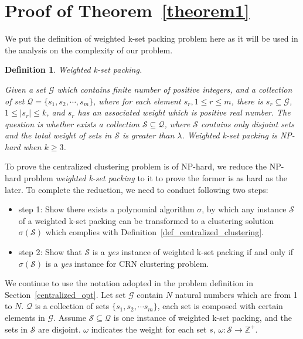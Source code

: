 \documentclass[10pt,journal,compsoc]{IEEEtran}
\makeatletter
\theoremstyle{mytheoremstyle}
\theoremstyle{mytheoremstyle}
\theoremstyle{mytheoremstyle}
\newtheorem{mydef}{Definition}%
\renewenvironment{proof}[1][\proofname]{%
      \par\pushQED{\qed}\fontfamily{ptm}\selectfont%
      \topsep6\p@\@plus6\p@\relax
      \trivlist\item[\hskip\labelsep\bfseries#1\@addpunct{.}]%
      \ignorespaces
    }{%
      \popQED\endtrivlist\@endpefalse
    }
\makeatother
\begin{document}
\section*{Proof of Theorem~\ref{theorem1}}
\label{proof_theorem1}
\begin{proof}
We put the definition of weighted k-set packing problem here as it will be used in the analysis on the complexity of our problem.

\begin{mydef}
\label{def_kset_packing}
\textit{Weighted k-set packing.} 

Given a set $\mathcal{G}$ which contains finite number of positive integers, and a collection of set $\mathcal{Q}=\{s_1,s_2,\cdots,s_m\}$, where for each element $s_r, 1\leq r \leq m$, there is $s_r\subseteq \mathcal{G}$, $ 1\leq|s_r| \leq k$, and $s_r$ has an associated weight which is positive real number.
The question is whether exists a collection $\mathcal{S}\subseteq \mathcal{Q}$, where $\mathcal{S}$ contains only disjoint sets and the total weight of sets in $\mathcal{S}$ is greater than $\lambda$.
Weighted k-set packing is NP-hard when $k\geqslant 3$.~\cite{Computers_a_Intractability}
\end{mydef}


To prove the centralized clustering problem is of NP-hard, we reduce the NP-hard problem \textit{weighted k-set packing} to it to prove the former is as hard as the later.
To complete the reduction, we need to conduct following two steps:
\begin{itemize}
\item step 1: Show there exists a polynomial algorithm $\sigma$, by which any instance $\mathcal{S}$ of a weighted k-set packing can be transformed to a clustering solution $\sigma(\mathcal{S})$ which complies with Definition~\ref{def_centralized_clustering}.
\item step 2: Show that $\mathcal{S}$ is a \textit{yes} instance of weighted k-set packing if and only if $\sigma(\mathcal{S})$ is a \textit{yes} instance for CRN clustering problem.
\end{itemize}

We continue to use the notation adopted in the problem definition in Section~\ref{centralized_opt}.
Let set $\mathcal{G}$ contain $N$ natural numbers which are from 1 to $N$.
$\mathcal{Q}$ is a collection of sets $\{s_1, s_2,\cdots s_m\}$, each set is composed with certain elements in $\mathcal{G}$.
Assume $\mathcal{S}\subseteq \mathcal{Q}$ is one instance of weighted k-set packing, and the sets in $\mathcal{S}$ are disjoint.
$\omega$ indicates the weight for each set $s$, $\omega:\mathcal{S}\rightarrow \mathbb{Z}^{+}$.




\end{proof}
\end{document}
